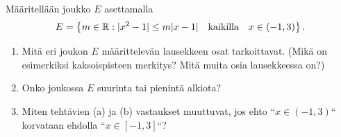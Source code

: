 \documentclass[12pt,a4paper]{article}
\begin{document}
\begin{exercise}
Määritellään joukko \(E\) asettamalla
\[E = \left\{m \in \mathbb{R} : \lvert x^2 - 1\rvert \leq m\lvert x - 1\rvert \quad
\text{kaikilla} \quad x \in (-1, 3) \right\}.\]
\begin{enumerate}[label=\alph*), nosep]
\item Mitä eri joukon \(E\) määrittelevän lausekkeen osat tarkoittavat.
(Mikä on esimerkiksi kaksoispisteen merkitys? Mitä muita osia lausekkeessa on?)
\item Onko joukossa \(E\) suurinta tai pienintä alkiota?
\item Miten tehtävien (a) ja (b) vastaukset muuttuvat, jos ehto ``\(x
\in (-1, 3)\)`` korvataan ehdolla ``\(x \in [-1, 3]\)``?
\end{enumerate}
\end{exercise}
\end{document}
